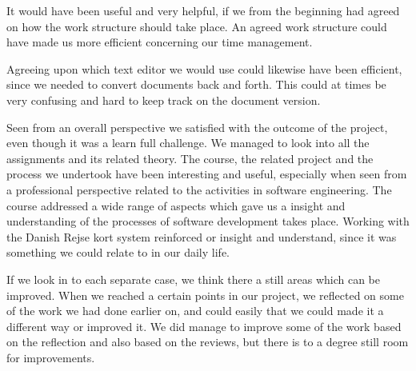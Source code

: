 It would have been useful and very helpful, if we from the beginning had agreed on how the work structure should take place. An agreed work structure could have made us more efficient concerning our time management.

Agreeing upon which text editor we would use could likewise have been efficient, since we needed to convert documents back and forth. This could at times be very confusing and hard to keep track on the document version.

Seen from an overall perspective we satisfied with the outcome of the project, even though it was a learn full challenge. We managed to look into all the assignments and its related theory. The course, the related project and the process we undertook have been interesting and useful, especially when seen from a professional perspective related to the activities in software engineering. The course addressed a wide range of aspects which gave us a insight and understanding of the processes of software development takes place. Working with the Danish Rejse kort system reinforced or insight and understand, since it was something we could relate to in our daily life.

If we look in to each separate case, we think there a still areas which can be improved. When we reached a certain points in our project, we reflected on some of the work we had done earlier on, and could easily that we could made it a different way or improved it. We did manage to improve some of the work based on the reflection and also based on the reviews, but there is to a degree still room for improvements.